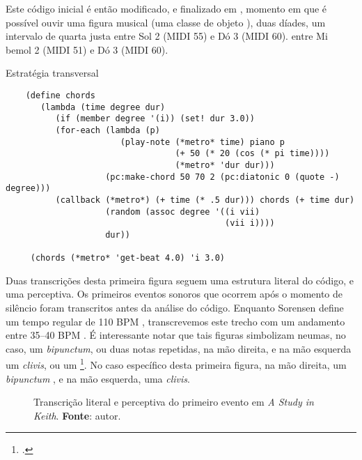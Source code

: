 Este código inicial é então modificado, e finalizado em , momento em que é possível ouvir uma figura musical (uma classe de objeto ), duas díades, um intervalo de quarta justa entre Sol 2 (MIDI 55) e Dó 3 (MIDI 60). entre Mi bemol 2 (MIDI 51) e Dó 3 (MIDI 60).

\begin{example}{Estratégia transversal}
\begin{verbatim}
    (define chords
       (lambda (time degree dur)
          (if (member degree '(i)) (set! dur 3.0))
          (for-each (lambda (p)
                       (play-note (*metro* time) piano p
                                  (+ 50 (* 20 (cos (* pi time))))
                                  (*metro* 'dur dur)))
                    (pc:make-chord 50 70 2 (pc:diatonic 0 (quote -) degree)))
          (callback (*metro*) (+ time (* .5 dur))) chords (+ time dur)
                    (random (assoc degree '((i vii)
                                            (vii i))))
                    dur))
    
     (chords (*metro* 'get-beat 4.0) 'i 3.0)
\end{verbatim}
\end{example}

Duas transcrições desta primeira figura seguem uma estrutura literal do código, e uma perceptiva. Os primeiros eventos sonoros que ocorrem após o momento de silêncio foram transcritos antes da análise do código. Enquanto Sorensen define um tempo regular de 110 BPM  , transcrevemos este trecho com um andamento entre 35--40 BPM . É interessante notar que tais figuras simbolizam neumas, no caso, um \emph{bipunctum}, ou duas notas repetidas, na mão direita, e na mão esquerda um \emph{clivis}, ou um \footnote{.}. No caso específico desta primeira figura, na mão direita, um \emph{bipunctum} , e na mão esquerda, uma \emph{clivis}.

\begin{figure}[!h]
  \centering
  \centering 
  
  
  
  \caption{Transcrição literal e perceptiva do primeiro evento em \emph{A Study in Keith}. \textbf{Fonte}: autor.}
  \label{fig:ask1}
\end{figure}

